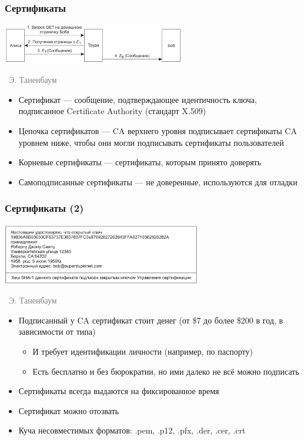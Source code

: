 \documentclass[xetex,mathserif,serif]{beamer}
\newcommand{\attribution}[1] {
\vspace{-5mm}\begin{flushright}\begin{scriptsize}\textcolor{gray}{\textcopyright\, #1}\end{scriptsize}\end{flushright}
}
\begin{document}
    \begin{frame}
        \frametitle{Сертификаты}
        \begin{center}
            \includegraphics[width=0.6\textwidth]{manInTheMiddle.png}
            \attribution{Э. Таненбаум}
        \end{center}
        \begin{itemize}
            \item Сертификат --- сообщение, подтверждающее идентичность ключа, подписанное Certificate Authority (стандарт X.509)
            \item Цепочка сертификатов --- CA верхнего уровня подписывает сертификаты CA уровнем ниже, чтобы они могли подписывать сертификаты пользователей
            \item Корневые сертификаты --- сертификаты, которым принято доверять
            \item Самоподписанные сертификаты --- не доверенные, используются для отладки
        \end{itemize}
    \end{frame}

    \begin{frame}
        \frametitle{Сертификаты (2)}
        \begin{center}
            \includegraphics[width=0.65\textwidth]{certificate.png}
            \attribution{Э. Таненбаум}
        \end{center}
        \begin{itemize}
            \item Подписанный у CA сертификат стоит денег (от \$7 до более \$200 в год, в зависимости от типа)
            \begin{itemize}
                \item И требует идентификации личности (например, по паспорту)
                \item Есть бесплатно и без бюрократии, но ими далеко не всё можно подписать
            \end{itemize}
            \item Сертификаты всегда выдаются на фиксированное время
            \item Сертификат можно отозвать
            \item Куча несовместимых форматов: .pem, .p12, .pfx, .der, .cer, .crt
        \end{itemize}
    \end{frame}
\end{document}
